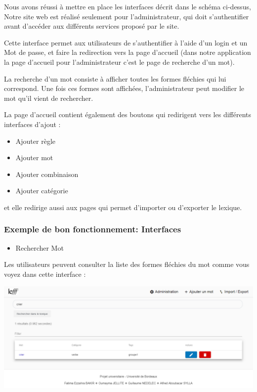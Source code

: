 \documentclass[12pt,a4paper]{article}
\begin{document}
Nous avons réussi à mettre en place les interfaces décrit dans le schéma ci-dessus,
Notre site web est réalisé seulement pour l'administrateur, qui doit s'authentifier
avant d'accéder aux différents services proposé par le site.

Cette interface permet aux utilisateurs de s'authentifier à l’aide d'un login et un Mot de passe, 
et faire la redirection vers la page d'accueil (dans notre application la page d'accueil
pour l'administrateur c'est le page de recherche d'un mot).

La recherche d'un mot consiste à afficher toutes les formes fléchies qui lui correspond. Une fois ces formes sont affichées, 
l'administrateur peut modifier le mot qu'il vient de rechercher.

La page d'accueil contient également des boutons qui redirigent vers les différents interfaces d'ajout : 
\begin{itemize}
    \item   Ajouter règle
    \item   Ajouter mot
    \item   Ajouter combinaison
    \item   Ajouter catégorie
   \end{itemize}
et elle redirige aussi aux  pages qui permet d'importer ou d'exporter le lexique.


\subsubsection{Exemple de bon fonctionnement: Interfaces} 

\begin{itemize}  
  \item Rechercher Mot
\end{itemize}
Les utilisateurs peuvent consulter la liste des formes fléchies du mot comme vous voyez dans cette interface :


\includegraphics[width=150mm]{img/Recherche.PNG}
\end{document}

